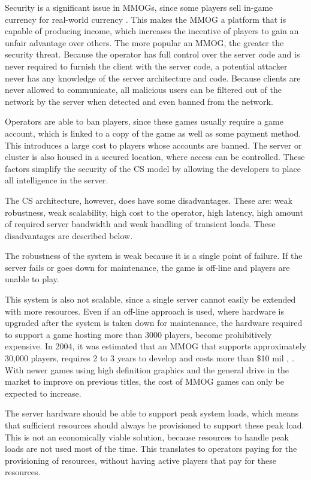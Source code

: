\documentclass[10pt,a4paper,journal,cspaper,compsoc]{IEEEtran}
\begin{document}
Security is a significant issue in MMOGs, since some players sell in-game currency for real-world currency \cite{chinese_gold_farmer}. This makes the
MMOG a platform that is capable of producing income, which increases the incentive of players to gain an unfair advantage over others. The more
popular an MMOG, the greater the security threat. Because the operator has full control over the server code and is never required to furnish the
client with the server code, a potential attacker never has any knowledge of the server architecture and code. Because clients are never allowed to
communicate, all malicious users can be filtered out of the network by the server when detected and even banned from the network.

Operators are able to ban players, since these games usually require a game account, which is linked to a copy of the game as well as some payment
method. This introduces a large cost to players whose accounts are banned. The server or cluster is also housed in a secured location, where access
can be controlled. These factors simplify the security of the \ac{CS} model by allowing the developers to place all intelligence in the server.

The \ac{CS} architecture, however, does have some disadvantages. These are: weak robustness, weak scalability, high cost to the operator, high
latency, high amount of required server bandwidth and weak handling of transient loads. These disadvantages are described below.

The robustness of the system is weak because it is a single point of failure. If the server fails or goes down for maintenance, the game is off-line
and players are unable to play.

This system is also not scalable, since a single server cannot easily be extended with more resources. Even if an off-line approach is used, where
hardware is upgraded after the system is taken down for maintenance, the hardware required to support a game hosting more than 3000 players, become
prohibitively expensive. In 2004, it was estimated that an MMOG that supports approximately 30,000 players, requires 2 to 3 years to develop and
costs more than \$10 mil \cite{cs_mmog_cost}, \cite{igda_online_whitepaper}. With newer games using high definition graphics and the general drive in
the market to improve on previous titles, the cost of MMOG games can only be expected to increase.

The server hardware should be able to support peak system loads, which means that sufficient resources should always be provisioned to support these
peak load. This is not an economically viable solution, because resources to handle peak loads are not used most of the time. This translates to
operators paying for the provisioning of resources, without having active players that pay for these resources.
\end{document}
